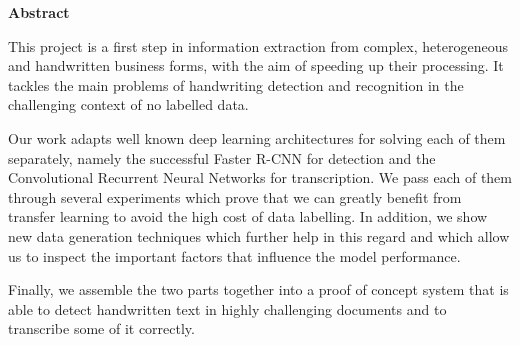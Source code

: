 \thispagestyle{plain}
\begin{center}

  \vspace*{3cm}

  \Large
  \textbf{Abstract}
  \vspace*{1.5cm}
\end{center}

\large
  This project is a first step in information extraction from complex, heterogeneous and handwritten business forms, with the aim of speeding up their processing. It tackles the main problems of handwriting detection and recognition in the challenging context of no labelled data.

  Our work adapts well known deep learning architectures for solving each of them separately, namely the successful Faster R-CNN for detection and the Convolutional Recurrent Neural Networks for transcription. We pass each of them through several experiments which prove that we can greatly benefit from transfer learning to avoid the high cost of data labelling. In addition, we show new data generation techniques which further help in this regard and which allow us to inspect the important factors that influence the model performance.

  Finally, we assemble the two parts together into a proof of concept system that is able to detect handwritten text in highly challenging documents and to transcribe some of it correctly.

\normalsize

